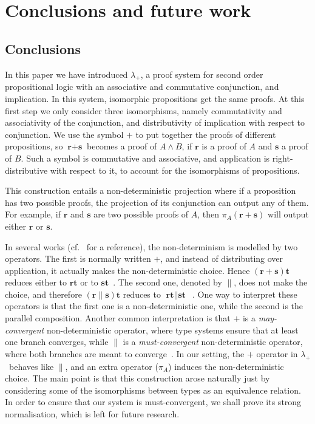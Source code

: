 \documentclass[final,copyright,creativecommons]{eptcs}
\newcommand{\OurCalculus}{\ensuremath{\lambda_+}}
\newcommand{\ve}[1]{\ensuremath{\mathrm{\textbf{#1}}}}
\theoremstyle{definition}
\begin{document}
\section{Conclusions and future work}\label{sec:conclusion}
\subsection{Conclusions}
In this paper we have introduced \OurCalculus, a proof system for second order propositional logic with an associative and commutative conjunction, and implication. In this system, isomorphic propositions get the same proofs. At this first step we only consider three isomorphisms, namely commutativity and associativity of the conjunction, and distributivity of implication with respect to conjunction. We use the symbol $+$ to put together the proofs of different propositions, so $\ve r+\ve s$ becomes a proof of $A\wedge B$, if $\ve r$ is a proof of $A$ and $\ve s$ a proof of $B$. Such a symbol is commutative and associative, and application is right-distributive with respect to it, to account for the isomorphisms of propositions.

This construction entails a non-deterministic projection where if a proposition has two possible proofs, the projection of its conjunction can output any of them. For example, if $\ve r$ and $\ve s$ are two possible proofs of $A$, then $\pi_A(\ve r+\ve s)$ will output either $\ve r$ or $\ve s$.

In several works (cf.~\cite[\S3.4]{ManzonettoPhDThesis} for a reference), the non-determinism is modelled by two operators. The first  is normally written $+$, and instead of distributing over application, it actually makes the non-deterministic choice. Hence $(\ve r+\ve s)\ve t$ reduces either to $\ve r\ve t$ or to $\ve s\ve t$~\cite{deLiguoroPipernoIC95}. The second one, denoted by $\parallel$, does not make the choice, and therefore $(\ve r\parallel\ve s)\ve t$ reduces to $\ve r\ve t\parallel\ve s\ve t$~\cite{DezaniciancagliniDeliguoroPipernoSIAM98}. One way to interpret these operators is that the first one is a non-deterministic one, while the second is the parallel composition. Another common interpretation is that $+$ is a {\it may-convergent} non-deterministic operator, where type systems ensure that at least one branch converges, while $\parallel$ is a {\it must-convergent} non-deterministic operator, where both branches are meant to converge~\cite{BucciarelliEhrhardManzonettoAPAL12,DiazcaroManzonettoPaganiLFCS13}. In our setting, the $+$ operator in \OurCalculus\ behaves like $\parallel$, and an extra operator ($\pi_A$) induces the non-deterministic choice.
The main point is that this construction arose naturally just by considering some of the isomorphisms between types as an equivalence relation.
In order to ensure that our system is must-convergent, we shall prove its strong normalisation, which is left for future research.
\end{document}
